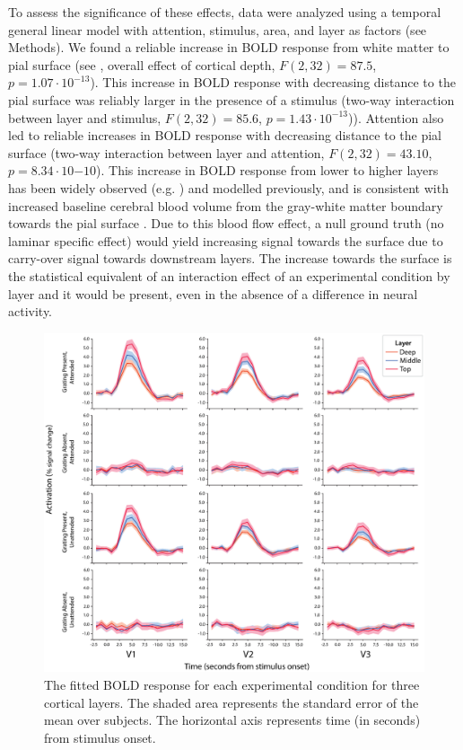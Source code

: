 \documentclass[9pt,lineno]{aperture}
\begin{document}
To assess the significance of these effects, data were analyzed using a temporal general linear model with attention, stimulus, area, and layer as factors (see Methods). We found a reliable increase in BOLD response from white matter to pial surface (see , overall effect of cortical depth, $F(2, 32)=87.5$, $p=1.07 \cdot 10^{-13}$). This increase in BOLD response with decreasing distance to the pial surface was reliably larger in the presence of a stimulus (two-way interaction between layer and stimulus, $F(2, 32)=85.6$, $p=1.43 \cdot 10^{-13}$)). Attention also led to reliable increases in BOLD response with decreasing distance to the pial surface (two-way interaction between layer and attention, $F(2,32)=43.10$, $p=8.34 \cdot 10{-10}$). 
This increase in BOLD response from lower to higher layers has been widely observed (e.g. \citet{Koopmans2010,Polimeni2010,Koopmans2011,Olman2012,Huber2018}) and modelled previously, and is consistent with increased baseline cerebral blood volume from the gray-white matter boundary towards the pial surface \citep{Markuerkiaga2016,Havlicek2020}. Due to this blood flow effect, a null ground truth (no laminar specific effect) would yield increasing signal towards the surface due to carry-over signal towards downstream layers. The increase towards the surface is the statistical equivalent of an interaction effect of an experimental condition by layer and it would be present, even in the absence of a difference in neural activity.
\begin{figure}
\includegraphics[width=\linewidth]{img/fir_layers.eps}
\caption{The fitted BOLD response for each experimental condition for three cortical layers. The shaded area represents the standard error of the mean over subjects. The horizontal axis represents time (in seconds) from stimulus onset.}
\label{fig:fir_layers}
\end{figure}
\end{document}
